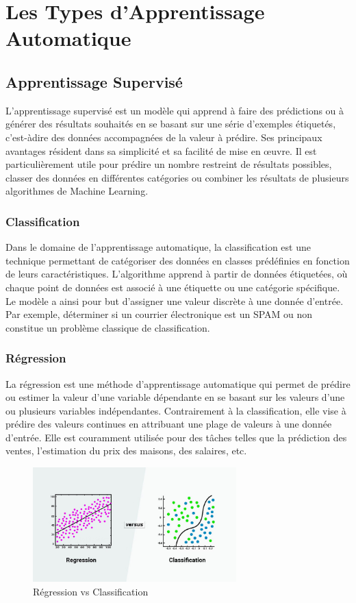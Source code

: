 \chapter{Les Types d’Apprentissage Automatique}
\label{chap:types}

\section{Apprentissage Supervisé}
\label{sec:supervise}
L’apprentissage supervisé est un modèle qui apprend à faire des prédictions ou à générer des résultats souhaités en se basant sur une série d'exemples étiquetés, c'est-àdire des données accompagnées de la valeur à prédire. Ses principaux avantages
résident dans sa simplicité et sa facilité de mise en œuvre. Il est particulièrement utile pour prédire un nombre restreint de résultats possibles, classer des données en différentes catégories ou combiner les résultats de plusieurs algorithmes de Machine Learning.


\subsection{Classification}
Dans le domaine de l'apprentissage automatique, la classification est une technique permettant de catégoriser des données en classes prédéfinies en fonction de leurs caractéristiques. L'algorithme apprend à partir de données étiquetées, où chaque point
de données est associé à une étiquette ou une catégorie spécifique. Le modèle a ainsi pour but d'assigner une valeur discrète à une donnée d'entrée. Par exemple, déterminer si un courrier électronique est un SPAM ou non constitue un problème classique de classification.




\subsection{Régression}
La régression est une méthode d'apprentissage automatique qui permet de prédire ou estimer la valeur d'une variable dépendante en se basant sur les valeurs d'une ou plusieurs variables indépendantes. Contrairement à la classification, elle vise à prédire des valeurs continues en attribuant une plage de valeurs à une donnée d'entrée. Elle est couramment utilisée pour des tâches telles que la prédiction des ventes, l'estimation du prix des maisons, des salaires, etc.

\begin{figure}[h]
    \centering
    \includegraphics[width=0.7\textwidth]{Imag/Regression_vs_Classification.png}
    \caption{Régression vs Classification}
    \label{fig:mon_image}
\end{figure}

